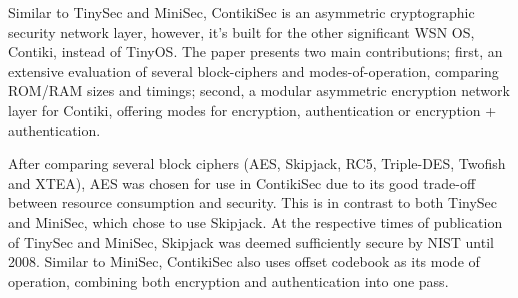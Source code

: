 Similar to TinySec\cite{TinySec} and MiniSec\cite{MiniSec}, ContikiSec \cite{ContikiSec} is an asymmetric cryptographic security network layer, however, it's built for the other significant WSN OS, Contiki, instead of TinyOS. The paper presents two main contributions; first, an extensive evaluation of several block-ciphers and modes-of-operation, comparing ROM/RAM sizes and timings; second, a modular asymmetric encryption network layer for Contiki, offering modes for encryption, authentication or encryption + authentication.

After comparing several block ciphers (AES, Skipjack, RC5, Triple-DES, Twofish and XTEA), AES was chosen for use in ContikiSec due to its good trade-off between resource consumption and security. This is in contrast to both TinySec and MiniSec, which chose to use Skipjack. At the respective times of publication of TinySec and MiniSec, Skipjack was deemed sufficiently secure by NIST until 2008. Similar to MiniSec, ContikiSec also uses offset codebook as its mode of operation, combining both encryption and authentication into one pass.